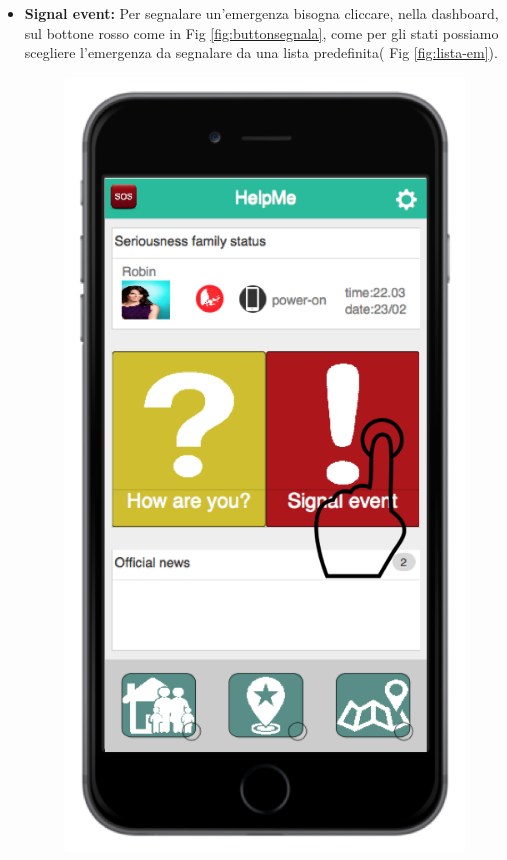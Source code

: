 \begin{itemize}
\item \textbf{Signal event:} Per segnalare un'emergenza bisogna cliccare, nella dashboard, sul bottone rosso come in Fig \ref{fig:buttonsegnala}, come per gli stati possiamo scegliere l'emergenza da segnalare da una lista predefinita( Fig \ref{fig:lista-em}).
 \begin{figure}[H]
	\centering
	\includegraphics[scale=1]{interfaccia/tapbuttonsegnala.png}

\end{figure}
\end{itemize}
